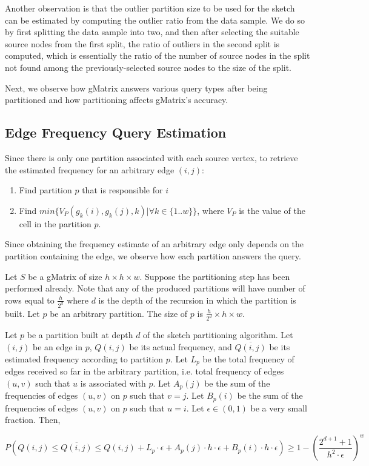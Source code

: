 Another observation is that the outlier partition size to be used for the sketch can be estimated by computing the outlier ratio from the data sample. We do so by first splitting the data sample into two, and then after selecting the suitable source nodes from the first split, the ratio of outliers in the second split is computed, which is essentially the ratio of the number of source nodes in the split not found among the previously-selected source nodes to the size of the split.

Next, we observe how gMatrix answers various query types after being partitioned and how partitioning affects gMatrix's accuracy.

\subsection{Edge Frequency Query Estimation}

Since there is only one partition associated with each source vertex, to retrieve the estimated frequency for an arbitrary edge $(i,j)$:

\begin{enumerate}
  \item Find partition $p$ that is responsible for $i$
  \item Find $min\{V_P(g_k(i),g_k(j),k)|\forall k \in \{1..w\}\}$, where $V_P$ is the value of the cell in the partition $p$. 
\end{enumerate}

Since obtaining the frequency estimate of an arbitrary edge only depends on the partition containing the edge, we observe how each partition answers the query.

Let $S$ be a gMatrix of size $h\times h\times w$. Suppose the partitioning step has been performed already. Note that any of the produced partitions will have number of rows equal to $\frac{h}{2^d}$ where $d$ is the depth of the recursion in which the partition is built. Let $p$ be an arbitrary partition. The size of $p$ is $\frac{h}{2^d}\times h\times w$.

\begin{theorem}
\label{thm:efreqguarantee}
Let $p$ be a partition built at depth $d$ of the sketch partitioning algorithm. Let $(i,j)$ be an edge in $p$, $Q(i,j)$ be its actual frequency, and $\overline{Q(i,j)}$ be its estimated frequency according to partition $p$. Let $L_p$ be the total frequency of edges received so far in the arbitrary partition, i.e. total frequency of edges $(u,v)$ such that $u$ is associated with $p$. Let $A_p(j)$ be the sum of the frequencies of edges $(u,v)$ on $p$ such that $v=j$. Let $B_p(i)$ be the sum of the frequencies of edges $(u,v)$ on $p$ such that $u=i$. Let $\epsilon \in (0,1)$ be a very small fraction. Then,
  
  \[
P(Q(i,j) \leq \overline{Q(i,j)} \leq Q(i,j) + L_p \cdot \epsilon + A_p(j) \cdot h \cdot \epsilon + B_p(i) \cdot h \cdot \epsilon) \geq 1-(\frac{2^{d+1}+1}{h^2\cdot\epsilon})^w
\]

\end{theorem}

